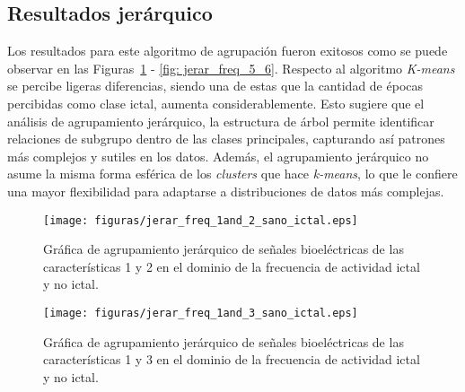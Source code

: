 \subsection{Resultados jerárquico}
Los resultados para este algoritmo de agrupación fueron exitosos como se puede observar en las Figuras~\ref{fig: jerar_freq_1_2} - \ref{fig: jerar_freq_5_6}. Respecto al algoritmo \textit{K-means} se percibe ligeras diferencias, siendo una de estas que la cantidad de épocas percibidas como clase ictal, aumenta considerablemente. Esto sugiere que el análisis de agrupamiento jerárquico, la estructura de árbol permite identificar relaciones de subgrupo dentro de las clases principales, capturando así patrones más complejos y sutiles en los datos. Además, el agrupamiento jerárquico no asume la misma forma esférica de los \textit{clusters} que hace \textit{k-means}, lo que le confiere una mayor flexibilidad para adaptarse a distribuciones de datos más complejas.

\begin{figure}[H]
    \centering
    \texttt{[image: figuras/jerar\_freq\_1and\_2\_sano\_ictal.eps]}
    \caption{Gráfica de agrupamiento jerárquico de señales bioeléctricas de las características 1 y 2 en el dominio de la frecuencia de actividad ictal y no ictal.}
    \label{fig: jerar_freq_1_2}
\end{figure}
\begin{figure}[H]
    \centering
    \texttt{[image: figuras/jerar\_freq\_1and\_3\_sano\_ictal.eps]}
    \caption{Gráfica de agrupamiento jerárquico de señales bioeléctricas de las características 1 y 3 en el dominio de la frecuencia de actividad ictal y no ictal.}
    \label{fig: jerar_freq_1_3}
\end{figure}

